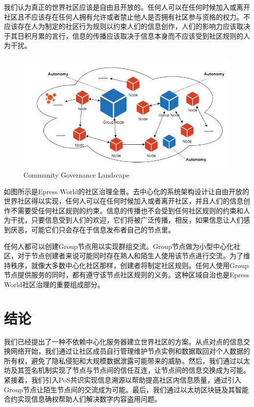 \documentclass[12pt,a4paper]{extarticle}
\begin{document}
    我们认为真正的世界社区应该是自由且开放的。任何人可以在任何时候加入或离开社区且不应该存在任何人拥有允许或者禁止他人是否拥有社区参与资格的权力。不应该存在人为制定的社区行为规则以约束人们的信息创作，人们的影响力应该取决于其日积月累的言行，信息的传播应该取决于信息本身而不应该受到社区规则的人为干扰。
    
    \begin{figure}[H]
        \centering
        \includegraphics[width=\textwidth]{figures-governance.png}
        \caption{Community Governance Landscape}
    \end{figure}

    如图所示是Epress World的社区治理全景。去中心化的系统架构设计让自由开放的世界社区得以实现，任何人可以在任何时候加入或者离开社区，并且人们的信息创作不需要受任何社区规则的约束。信息的传播也不会受到任何社区规则的约束和人为干扰，只要信息受到人们的欢迎，它们将被广泛传播，相反，如果信息让人们感到厌恶，可能它们只会存在于信息发布者自己的节点里。
    
    任何人都可以创建Group节点用以实现群组交流。Group节点做为小型中心化社区，对于节点创建者来说可能同时存在熟人和陌生人使用该节点进行交流。为了维持秩序，就像大多数中心化社区那样，创建者将制定社区规则。任何人使用Group节点提供服务的同时，都有遵守该节点社区规则的义务。这种区域自治也是Epress World社区治理的重要组成部分。
\section{结论}
    我们已经提出了一种不依赖中心化服务器建立世界社区的方案。从点对点的信息交换网络开始，我们通过让社区成员自行管理维护节点实例和数据取回对个人数据的所有权，避免了隐私侵犯和大规模数据泄露可能带来的威胁。然后，我们通过以太坊及其签名机制实现了节点与节点间的信任互连，让节点间的信息交换成为可能。紧接着，我们引入PoS共识实现信息溯源以帮助提高社区内信息质量，通过引入Group节点让陌生节点间的交流成为可能。最后，我们通过以太坊区块链及其智能合约实现信息确权帮助人们解决数字内容盗用问题。
\end{document}
